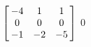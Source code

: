 {$\left[\hskip -3pt \begin{array}{ccc} -4&1&1\\  0&0&0
\\  -1&-2&-5\end{array}\hskip -3pt \right]$} 
{$0$}



  

